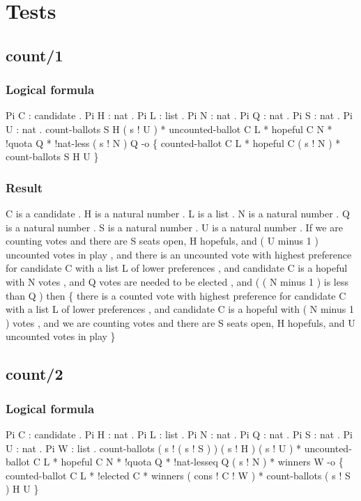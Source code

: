 \chapter{Tests}
\label{A_04}

\section{count/1}
\subsection{Logical formula}
\begin{texto2}
	Pi C : candidate . Pi H : nat . Pi L : list . Pi N : nat . Pi Q : nat . Pi S : nat . Pi U : nat . count-ballots S H ( s ! U ) * uncounted-ballot C L * hopeful C N * !quota Q * !nat-less ( s ! N ) Q -o \{ counted-ballot C L * hopeful C ( s ! N ) * count-ballots S H U \}
\end{texto2}

\subsection{Result}
\begin{texto2}
	C is a candidate . H is a natural number . L is a list . N is a natural number . Q is a natural number . S is a natural number . U is a natural number . If we are counting votes and there are S seats open, H hopefuls, and ( U minus 1 ) uncounted votes in play , and there is an uncounted vote with highest preference for candidate C with a list L of lower preferences , and candidate C is a hopeful with N votes , and Q votes are needed to be elected , and ( ( N minus 1 ) is less than Q ) then \{ there is a counted vote with highest preference for candidate C with a list L of lower preferences , and candidate C is a hopeful with ( N minus 1 ) votes , and we are counting votes and there are S seats open, H hopefuls, and U uncounted votes in play \}
\end{texto2}

\section{count/2}
\subsection{Logical formula}
\begin{texto2}
	Pi C : candidate . Pi H : nat . Pi L : list . Pi N : nat . Pi Q : nat . Pi S : nat . Pi U : nat . Pi W : list . count-ballots ( s ! ( s ! S ) ) ( s ! H ) ( s ! U ) * uncounted-ballot C L * hopeful C N * !quota Q * !nat-lesseq Q ( s ! N ) * winners W -o \{ counted-ballot C L * !elected C * winners ( cons ! C ! W ) * count-ballots ( s ! S ) H U \}
\end{texto2}

